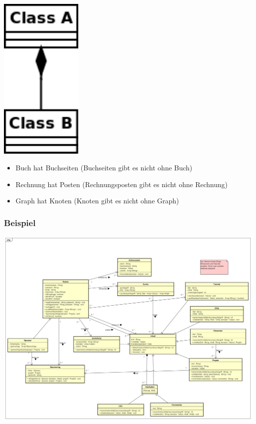 \documentclass[11pt, a4paper]{article}
\begin{document}
\begin{minipage}[h]{0.3\textwidth}
    \raggedleft \includegraphics[width=0.3\textwidth]{Klassen-Elemente/4.png} 
\end{minipage}
\begin{minipage}[h]{0.65\textwidth}
    \begin{itemize}
        \item Buch hat Buchseiten (Buchseiten gibt es nicht ohne Buch)
        \item Rechnung hat Posten (Rechnungsposten gibt es nicht ohne Rechnung)
        \item Graph hat Knoten (Knoten gibt es nicht ohne Graph)
    \end{itemize}
\end{minipage}

\vspace{3em}

\raggedright \subsubsection*{Beispiel}

\vspace{1em}

\centering \includegraphics[width=1\textwidth]{Klassen-02.png}
\end{document}
